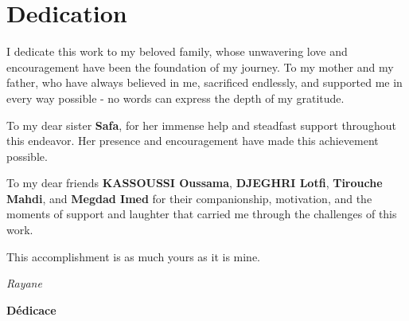 \chapter*{Dedication}

{\large{}

I dedicate this work to my beloved family, whose unwavering love and encouragement have been the foundation of my journey. To my mother and my father, who have always believed in me, sacrificed endlessly, and supported me in every way possible - no words can express the depth of my gratitude.

\vspace{12pt}

To my dear sister \textbf{Safa}, for her immense help and steadfast support throughout this endeavor. Her presence and encouragement have made this achievement possible.

\vspace{12pt}

To my dear friends \textbf{KASSOUSSI Oussama}, \textbf{DJEGHRI Lotfi}, \textbf{Tirouche Mahdi}, and \textbf{Megdad Imed} for their companionship, motivation, and the moments of support and laughter that carried me through the challenges of this work.

\vspace{18pt}

This accomplishment is as much yours as it is mine.

}

\vspace*{\fill}

\begin{flushright}
\textit{Rayane}
\end{flushright}

\newpage

\thispagestyle{empty}

\begin{center}
{\Huge\bfseries Dédicace}
\end{center}

\vspace{1cm}

